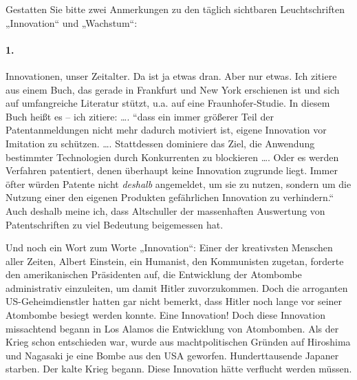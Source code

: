 \documentclass[12pt,a4paper]{article}
\begin{document}
Gestatten Sie bitte zwei Anmerkungen zu den täglich sichtbaren Leuchtschriften
„Innovation“ und „Wachstum“:

\paragraph{1.}
Innovationen, unser Zeitalter. Da ist ja etwas dran. Aber nur etwas. Ich
zitiere aus einem Buch, das gerade in Frankfurt und New York erschienen ist und
sich auf umfangreiche Literatur stützt, u.a. auf eine Fraunhofer-Studie. In
diesem Buch heißt es – ich zitiere: …. “dass ein immer größerer Teil der
Patentanmeldungen nicht mehr dadurch motiviert ist, eigene Innovation vor
Imitation zu schützen. …. Stattdessen dominiere das Ziel, die Anwendung
bestimmter Technologien durch Konkurrenten zu blockieren …. Oder es werden
Verfahren patentiert, denen überhaupt keine Innovation zugrunde liegt. Immer
öfter würden Patente nicht \emph{deshalb} angemeldet, um sie zu nutzen, sondern
um die Nutzung einer den eigenen Produkten gefährlichen Innovation zu
verhindern.“ Auch deshalb meine ich, dass Altschuller der massenhaften
Auswertung von Patentschriften zu viel Bedeutung beigemessen hat.

Und noch ein Wort zum Worte „Innovation“: Einer der kreativsten Menschen aller
Zeiten, Albert Einstein, ein Humanist, den Kommunisten zugetan, forderte den
amerikanischen Präsidenten auf, die Entwicklung der Atombombe administrativ
einzuleiten, um damit Hitler zuvorzukommen. Doch die arroganten
US-Geheimdienstler hatten gar nicht bemerkt, dass Hitler noch lange vor seiner
Atombombe besiegt werden konnte. Eine Innovation! Doch diese Innovation
missachtend begann in Los Alamos die Entwicklung von Atombomben. Als der Krieg
schon entschieden war, wurde aus machtpolitischen Gründen auf Hiroshima und
Nagasaki je eine Bombe aus den USA geworfen. Hunderttausende Japaner starben.
Der kalte Krieg begann. Diese Innovation hätte verflucht werden müssen.
\end{document}
